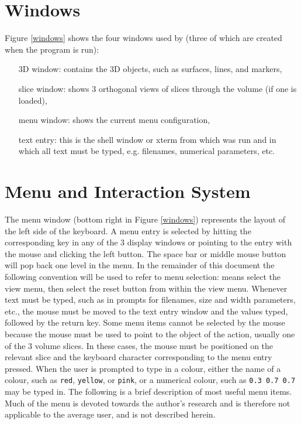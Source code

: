 \section{\display Windows}


Figure \ref{windows} shows the four windows used by \display (three of which
are created when the program is run):

\begin{itemize}
\item[3D window:]  contains the 3D objects, such as surfaces, lines,
                  and markers,
\item[slice window:]  shows 3 orthogonal views of slices through the volume
                     (if one is loaded),
\item[menu window:]  shows the current menu configuration,
\item[text entry:]  this is the shell window or xterm from which \display was
                   run and in which all text must be typed, e.g. filenames,
                   numerical parameters, etc.
\end{itemize}

\section{Menu and Interaction System}

The menu window (bottom right in Figure \ref{windows}) represents the layout
of the left side of the keyboard.  A menu entry is selected by hitting the
corresponding key in any of the 3 display windows or pointing to the entry
with the mouse and clicking the left button.  The space bar or middle mouse
button will pop back one level in the menu.  In the remainder of this document
the following convention will be used to refer to menu selection:
 means select the view menu, then select the reset button
from within the view menu.  Whenever text must be typed, such as in prompts
for filenames, size and width parameters, etc., the mouse must be moved to the
text entry window and the values typed, followed by the return key.
Some menu items cannot be selected by the mouse because the mouse must be
used to point to the object of the action, usually one of the 3 volume slices.
In these cases, the mouse must be positioned on the relevant slice and the
keyboard character corresponding to the menu entry pressed.
When the user is prompted to type in a colour, either the name of a colour,
such as {\tt red}, {\tt yellow}, or {\tt pink}, or a numerical colour,
such as \mbox{\tt 0.3 0.7 0.7} may be typed in.  The following is a brief
description of most useful menu items.  Much of the menu is devoted towards
the author's research and is therefore not applicable to the average 
user, and is not described herein.

